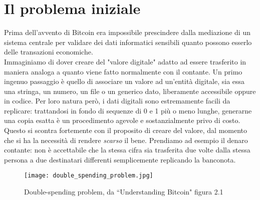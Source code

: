 \section{Il problema iniziale}
	Prima dell'avvento di Bitcoin era impossibile prescindere dalla mediazione di un sistema centrale per validare dei dati informatici sensibili quanto possono esserlo delle transazioni economiche. \\
	Immaginiamo di dover creare del "valore digitale" adatto ad essere trasferito in maniera analoga a quanto viene fatto normalmente con il contante. Un primo ingenuo passaggio è quello di associare un valore ad un'entità digitale, sia essa una stringa, un numero, un file o un generico dato, liberamente accessibile oppure in codice. Per loro natura però, i dati digitali sono estremamente facili da replicare: trattandosi in fondo di sequenze di 0 e 1 più o meno lunghe, generarne una copia esatta è un procedimento agevole e sostanzialmente privo di costo. Questo si scontra fortemente con il proposito di creare del valore, dal momento che si ha la necessità di rendere \emph{scarso} il bene. Prendiamo ad esempio il denaro contante: non è accettabile che la stessa cifra sia trasferita due volte dalla stessa persona a due destinatari differenti semplicemente replicando la banconota.
	\begin{figure}[ht]
		\centering
		\texttt{[image: double\_spending\_problem.jpg]}
		\caption{Double-spending problem, da ``Understanding Bitcoin" \cite{understanding_bitcoin} figura 2.1}
		\label{fig:double-spending_img}
	\end{figure}


